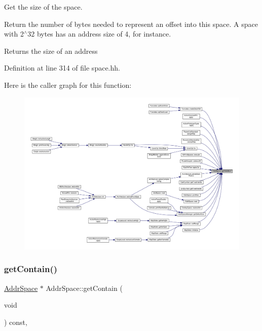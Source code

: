 Get the size of the space. 

Return the number of bytes needed to represent an offset into this space. A space with 2$^\wedge$32 bytes has an address size of 4, for instance. \begin{DoxyReturn}{Returns}
the size of an address 
\end{DoxyReturn}


Definition at line 314 of file space.\+hh.

Here is the caller graph for this function\+:
\nopagebreak
\begin{figure}[H]
\begin{center}
\leavevmode
\includegraphics[width=350pt]{class_addr_space_aa4217d683f1de141406d009dc4364874_icgraph}
\end{center}
\end{figure}
\mbox{\label{class_addr_space_a616f457a28ab5779167183f47a5707b8}} 
\subsubsection{\texorpdfstring{getContain()}{getContain()}}
{\footnotesize\ttfamily \mbox{\hyperlink{class_addr_space}{Addr\+Space}} $\ast$ Addr\+Space\+::get\+Contain (\begin{DoxyParamCaption}\item[{void}]{ }\end{DoxyParamCaption}) const\hspace{0.3cm}{\ttfamily [inline]}, {\ttfamily [virtual]}}



